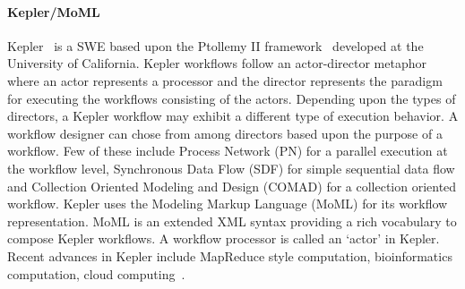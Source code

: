 \paragraph{Kepler/MoML} Kepler~\cite{kepler2013} is a SWE
based upon the Ptollemy II framework~\cite{eker-janneck-etal:2003} developed at
the University of California. Kepler workflows follow an actor-director
metaphor where an actor represents a processor and the director
represents the paradigm for executing the workflows consisting of the actors.
Depending upon the types of directors, a Kepler workflow may exhibit a
different type of execution behavior. A workflow designer can chose from among
directors based upon the purpose of a workflow. Few of these include Process
Network (PN) for a parallel execution at the workflow level, Synchronous Data
Flow (SDF) for simple sequential data flow and Collection Oriented Modeling and
Design (COMAD) \cite{keplercomad} for a collection oriented workflow. Kepler
uses the Modeling Markup Language (MoML) for its workflow representation. MoML
is an extended XML syntax providing a rich vocabulary to compose Kepler
workflows. A workflow processor is called an `actor' in Kepler. Recent advances
in Kepler include MapReduce style computation, bioinformatics computation,
cloud computing~\cite{kepler2013}.
